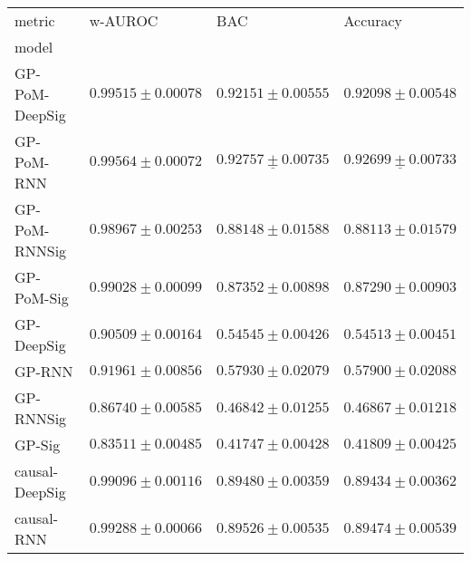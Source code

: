 \begin{tabular}{llll}
\toprule
metric &                                           w-AUROC &                                               BAC &                                          Accuracy \\
model          &                                                   &                                                   &                                                   \\
\midrule
GP-PoM-DeepSig &                           $ 0.99515 \pm 0.00078 $ &                           $ 0.92151 \pm 0.00555 $ &                           $ 0.92098 \pm 0.00548 $ \\
GP-PoM-RNN     &                           $ 0.99564 \pm 0.00072 $ &            $  \underline{ 0.92757 \pm 0.00735 } $ &            $  \underline{ 0.92699 \pm 0.00733 } $ \\
GP-PoM-RNNSig  &                           $ 0.98967 \pm 0.00253 $ &                           $ 0.88148 \pm 0.01588 $ &                           $ 0.88113 \pm 0.01579 $ \\
GP-PoM-Sig     &                           $ 0.99028 \pm 0.00099 $ &                           $ 0.87352 \pm 0.00898 $ &                           $ 0.87290 \pm 0.00903 $ \\
GP-DeepSig     &                           $ 0.90509 \pm 0.00164 $ &                           $ 0.54545 \pm 0.00426 $ &                           $ 0.54513 \pm 0.00451 $ \\
GP-RNN         &                           $ 0.91961 \pm 0.00856 $ &                           $ 0.57930 \pm 0.02079 $ &                           $ 0.57900 \pm 0.02088 $ \\
GP-RNNSig      &                           $ 0.86740 \pm 0.00585 $ &                           $ 0.46842 \pm 0.01255 $ &                           $ 0.46867 \pm 0.01218 $ \\
GP-Sig         &                           $ 0.83511 \pm 0.00485 $ &                           $ 0.41747 \pm 0.00428 $ &                           $ 0.41809 \pm 0.00425 $ \\
causal-DeepSig &                           $ 0.99096 \pm 0.00116 $ &                           $ 0.89480 \pm 0.00359 $ &                           $ 0.89434 \pm 0.00362 $ \\
causal-RNN     &                           $ 0.99288 \pm 0.00066 $ &                           $ 0.89526 \pm 0.00535 $ &                           $ 0.89474 \pm 0.00539 $ \\

\end{tabular}
